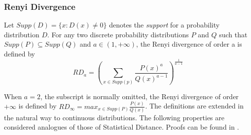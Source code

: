 \subsubsection{Renyi Divergence}
\label{sec:renyisubdefinition}
\begin{definition}
   Let \(Supp(D) = \{x: D(x) \neq 0\}\) denotes the
  \textit{support} for a probability distribution \(D\). For any two discrete
  probability distributions \(P\) and \(Q\) such that
  \(Supp(P) \subseteq Supp(Q)\) and \(a \in (1, +\infty)\), the Renyi divergence
  of order a is defined by\\
  $$RD_{a} = \left(\sum_{x \in Supp(p)}\frac{P(x)^{a}}{Q(x)^{a-1}}\right)^{\frac{1}{a-1}}$$
\end{definition}
When \(a = 2\), the subscript is normally omitted, the Renyi divergence of
order \(+\infty\) is defined by
\(RD_{\infty} = max_{x \in Supp(P)}\frac{P(x)}{Q(x)}\). The definitions are
extended in the natural way to continuous distributions. The following
properties are considered analogues of those of Statistical Distance. Proofs can
be found in \cite{langlois2014gghlite}.
